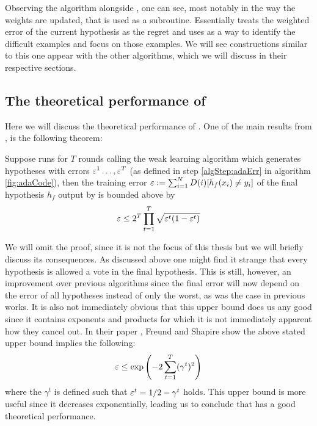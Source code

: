 Observing the \hedge\cite{Freund1997} algorithm alongside \adaB, one can see, most notably in the way the weights are updated, that \hedge is used as a subroutine. Essentially \adaB treats the weighted error of the current hypothesis as the regret and uses \hedge as a way to identify the difficult examples and focus \weak on those examples. We will see constructions similar to this one appear with the other algorithms, which we will discuss in their respective sections.
\subsection{The theoretical performance of \adaB}

\label{subsec:AdaTheoPerf}
Here we will discuss the theoretical performance of \adaB. One of the main results from \cite{Freund1997}, is the following theorem: 
\begin{theorem}\label{thm:adaErr}\cite{Freund1997}
Suppose \adaB runs for $T$ rounds calling the weak learning algorithm \weak which generates hypotheses with errors $\varepsilon^1\ldots, \varepsilon^T$ (as defined in step \ref{algStep:adaErr} in algorithm \ref{fig:adaCode}), then the training error $\varepsilon:=\sum_{i=1}^ND(i)[h_f(x_i)\neq y_i]$ of the final hypothesis $h_f$ output by \adaB is bounded above by $$\varepsilon\leq 2^T\prod^T_{t=1}\sqrt{\varepsilon^t(1-\varepsilon^t)}$$
\end{theorem}
We will omit the proof, since it is not the focus of this thesis but we will briefly discuss its consequences. As discussed above one might find it strange that every hypothesis is allowed a vote in the final hypothesis. This is still, however, an improvement over previous algorithms since the final error will now depend on the error of all hypotheses instead of only the worst, as was the case in previous works. It is also not immediately obvious that this upper bound does us any good since it contains exponents and products for which it is not immediately apparent how they cancel out. In their paper \cite{Freund1997}, Freund and Shapire show the above stated upper bound implies the following: $$\varepsilon\leq \exp\left(-2\sum^T_{t=1}(\gamma^t)^2\right)$$ where the $\gamma^t$ is defined such that $\varepsilon^t=1/2-\gamma^t$ holds. This upper bound is more useful since it decreases exponentially, leading us to conclude that \adaB has a good theoretical performance.   


\section{\NHB}
\label{sec:NHB}
